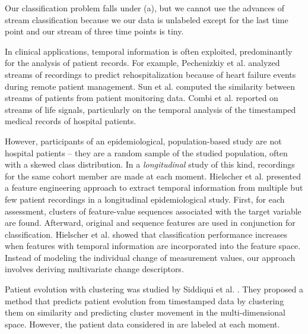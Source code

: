 \documentclass[
  oneside]{book}
\begin{document}
Our classification problem falls under (a), but we cannot use the advances of stream classification because we our data is unlabeled except for the last time point and our stream of three time points is tiny.

In clinical applications, temporal information is often exploited, predominantly for the analysis of patient records.
For example, Pechenizkiy et al. \autocite{PechenizkiyEtAl:CBMS10} analyzed streams of recordings to predict rehospitalization because of heart failure events during remote patient management.
Sun et al. \autocite{SunEtAl:ICDM10} computed the similarity between streams of patients from patient monitoring data.
Combi et al. \autocite{CombiEtAl:2010} reported on streams of life signals, particularly on the temporal analysis of the timestamped medical records of hospital patients.

However, participants of an epidemiological, population-based study are not hospital patients -- they are a random sample of the studied population, often with a skewed class distribution.
In a \emph{longitudinal} study of this kind, recordings for the same cohort member are made at each moment.
Hielscher et al. \autocite{HielscherEtAl:IDA14} presented a feature engineering approach to extract temporal information from multiple but few patient recordings in a longitudinal epidemiological study.
First, for each assessment, clusters of feature-value sequences associated with the target variable are found.
Afterward, original and sequence features are used in conjunction for classification.
Hielscher et al. \autocite{HielscherEtAl:IDA14} showed that classification performance increases when features with temporal information are incorporated into the feature space.
Instead of modeling the individual change of measurement values, our approach involves deriving multivariate change descriptors.

Patient evolution with clustering was studied by Siddiqui et al. \autocite{SiddiquiEtAl:BIH14}.
They proposed a method that predicts patient evolution from timestamped data by clustering them on similarity and predicting cluster movement in the multi-dimensional space.
However, the patient data considered in \autocite{SiddiquiEtAl:BIH14} are labeled at each moment.
\end{document}
